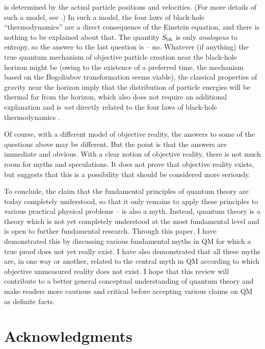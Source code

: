 \documentclass[12pt]{article}
\begin{document}
is determined by the actual particle positions and velocities. 
(For more details of such a model, see \cite{niksemicl}.)
In such a model,
the four laws of black-hole ``thermodynamics'' are a direct consequence 
of the Einstein equation, and there is nothing to be explained 
about that. The quantity $S_{\rm bh}$ is only {\em analogous}
to entropy, so the answer to the last question is -- no.
Whatever (if anything) the true quantum mechanism of objective 
particle creation near the black-hole horizon might be 
(owing to the existence of a preferred time, the mechanism based 
on the Bogoliubov transformation seems viable), 
the classical properties of gravity near the horizon imply
that the distribution of particle energies will be thermal
far from the horizon, which also does not require an additional 
explanation and is {\em not} directly related to the 
four laws of black-hole thermodynamics \cite{viss}.

Of course, with a different model of objective reality, the answers
to some of the questions above may be different. But the point is 
that the answers are immediate and obvious. With 
a clear notion of objective reality, there is not much room for 
myths and speculations. It does not prove that objective reality 
exists, but suggests that this is a possibility that
should be considered more seriously. 

To conclude, the claim that the fundamental principles
of quantum theory are today completely understood, so that it only
remains to apply these principles to various practical physical problems --
is also a myth. Instead, quantum theory is a theory which is not yet
completely understood at the most fundamental level and is open
to further fundamental research. Through this paper, I have
demonstrated this by discussing various fundamental myths in QM for which
a true proof does not yet really exist. I have also demonstrated 
that all these myths are, in one way or another, related to the 
central myth in QM according to which objective unmeasured reality
does not exist. I hope that this review will contribute to a 
better general conceptual understanding of quantum theory and make readers 
more cautious and critical before accepting various claims 
on QM as definite facts.  
 



\section{Acknowledgments}
\end{document}
